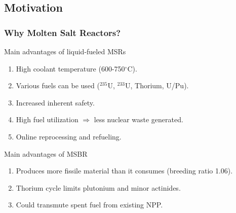 \subsection{Motivation}
\begin{frame}
  \frametitle{Why Molten Salt Reactors?}
                  \vspace*{-0.1in}
              \begin{block}{Main advantages of liquid-fueled \glspl{MSR} \cite{elsheikh_safety_2013}}
               \begin{enumerate}
                \item High coolant temperature (600-750$^{\circ}$C).
                \item Various fuels can be used ($^{235}$U, $^{233}$U, Thorium, U/Pu).
                \item Increased inherent safety.
                \item High fuel utilization $\Rightarrow$ less nuclear waste generated.
                \item Online reprocessing and refueling.
               \end{enumerate}
               \end{block}
                  \vspace*{-0.1in}               
               \begin{block}{Main advantages of \gls{MSBR} \cite{robertson_conceptual_1971}}
               \begin{enumerate}
                \item Produces more fissile material than it consumes (breeding ratio 1.06).
                \item Thorium cycle limits plutonium and minor actinides.
                \item Could transmute spent fuel from existing \gls{NPP}.
               \end{enumerate}
               \end{block}

\end{frame}


